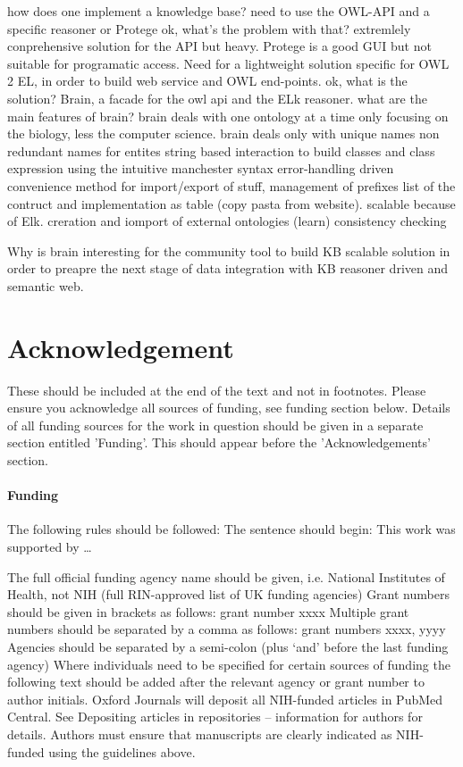 \documentclass{bioinfo}
\begin{document}
how does one implement a knowledge base?
need to use the OWL-API and a specific reasoner or Protege
ok, what's the problem with that?
extremlely conprehensive solution for the API but heavy. Protege is a good GUI but not suitable for programatic access.
Need for a lightweight solution specific for OWL 2 EL, in order to build web service and OWL end-points.
ok, what is the solution?
Brain, a facade for the owl api and the ELk reasoner.
what are the main features of brain?
brain deals with one ontology at a time only
focusing on the biology, less the computer science.
brain deals only with unique names non redundant names for entites
string based interaction to build classes and class expression using the intuitive manchester syntax
error-handling driven
convenience method for import/export of stuff, management of prefixes
list of the contruct and implementation as table (copy pasta from website).
scalable because of Elk.
creration and iomport of external ontologies (learn)
consistency checking

Why is brain interesting for the community
tool to build KB scalable solution in order to preapre the next stage of data integration with KB reasoner driven and semantic web.

\section*{Acknowledgement}
These should be included at the end of the text and not in footnotes. Please ensure you acknowledge all 
sources of funding, see funding section below.
Details of all funding sources for the work in question should be given 
in a separate section entitled 'Funding'. This should appear before the 'Acknowledgements' section.

\paragraph{Funding\textcolon}
The following rules should be followed:
The sentence should begin: This work was supported by …
 
The full official funding agency name should be given, i.e. National Institutes of Health, not NIH 
(full RIN-approved list of UK funding agencies) Grant numbers should be given in brackets as follows: grant number xxxx 
Multiple grant numbers should be separated by a comma as follows: grant numbers xxxx, yyyy 
Agencies should be separated by a semi-colon (plus ‘and’ before the last funding agency) 
Where individuals need to be specified for certain sources of funding the following text should be added after the
relevant agency or grant number to author initials.
Oxford Journals will deposit all NIH-funded articles in PubMed Central. See Depositing articles in repositories – 
information for authors for details. Authors must ensure that manuscripts are clearly indicated as NIH-funded using the guidelines above.










\end{document}

